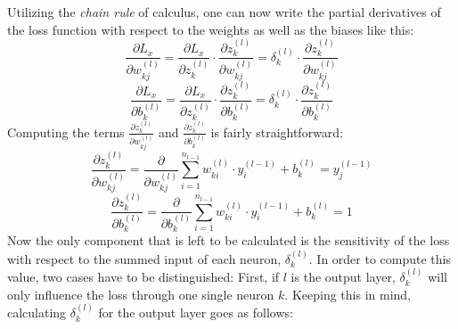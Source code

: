 Utilizing the \textit{chain rule} of calculus, one can now write the
partial derivatives of the loss function with respect to the weights
as well as the biases like this:
\begin{equation}
\label{eq:gradient-weight}
  \frac{\partial L_x}{\partial w_{kj}^{(l)}} = \frac{\partial
    L_x}{\partial z_k^{(l)}} \cdot \frac{\partial z_k^{(l)}}{\partial
    w_{kj}^{(l)}} = \delta_k^{(l)} \cdot \frac{\partial z_k^{(l)}}{\partial
    w_{kj}^{(l)}}
\end{equation}
\begin{equation}
\label{eq:gradient-bias}
  \frac{\partial L_x}{\partial b_k^{(l)}} = \frac{\partial
    L_x}{\partial z_k^{(l)}} \cdot \frac{\partial z_k^{(l)}}{\partial
    b_{k}^{(l)}} = \delta_k^{(l)} \cdot \frac{\partial z_k^{(l)}}{\partial
    b_{k}^{(l)}}
\end{equation}
Computing the terms \(\frac{\partial z_k^{(l)}}{\partial
  w_{kj}^{(l)}}\) and \(\frac{\partial z_k^{(l)}}{\partial
  b_{k}^{(l)}}\) is fairly straightforward:
\begin{equation}
\frac{\partial z_k^{(l)}}{\partial w_{kj}^{(l)}} =
\frac{\partial}{\partial
  w_{kj}^{(l)}}\sum_{i=1}^{n_{l-1}}{w_{ki}^{(l)} \cdot y_i^{(l-1)}} +
b_k^{(l)} = y_j^{(l-1)}
\end{equation}
\begin{equation}
\frac{\partial z_k^{(l)}}{\partial b_{k}^{(l)}} =
\frac{\partial}{\partial
  b_{k}^{(l)}}\sum_{i=1}^{n_{l-1}}{w_{ki}^{(l)} \cdot y_i^{(l-1)}} +
b_k^{(l)} = 1
\end{equation}
Now the only component that is left to be calculated is the
sensitivity of the loss with respect to the summed input of each
neuron, \(\delta_k^{(l)}\).
In order to compute this value, two cases have to be distinguished:
First, if \(l\) is the output layer, \(\delta_k^{(l)}\) will only
influence the loss through one single neuron \(k\). Keeping this in
mind, calculating \(\delta_k^{(l)}\) for the output layer goes as
follows:

